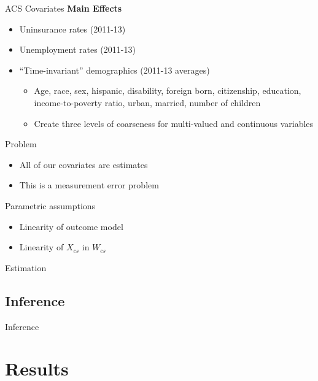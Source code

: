 \documentclass[hyperref={pdfpagelabels=false}]{beamer}
\begin{document}
\begin{frame}{ACS Covariates}
\textbf{Main Effects}
\begin{itemize}
    \item Uninsurance rates (2011-13) 
    \item Unemployment rates (2011-13) 
    \item ``Time-invariant'' demographics (2011-13 averages)
    \begin{itemize}
        \item Age, race, sex, hispanic, disability, foreign born, citizenship, education, income-to-poverty ratio, urban, married, number of children
        \item Create three levels of coarseness for multi-valued and continuous variables 
    \end{itemize}
\end{itemize}
\end{frame}

\begin{frame}{Problem}
    \begin{itemize}
        \item All of our covariates are estimates
        \item This is a measurement error problem
    \end{itemize}
\end{frame}

\begin{frame}{Parametric assumptions}
    \begin{itemize}
        \item Linearity of outcome model \bigskip
        \item Linearity of $X_{cs}$ in $W_{cs}$ 
    \end{itemize}
\end{frame}

\begin{frame}{Estimation}

\end{frame}

\subsection{Inference}

\begin{frame}{Inference}

\end{frame}

\section{Results}
\end{document}
